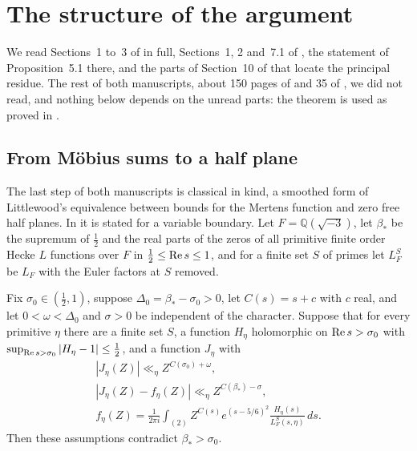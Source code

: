 \section{The structure of the argument}\label{qrh:sec:argument}

We read Sections~1 to~3 of \cite{OAI26b} in full, Sections~1, 2 and~7.1 of \cite{OAI26a}, the statement of Proposition~5.1 there, and the parts of Section~10 of \cite{OAI26a} that locate the principal residue. The rest of both manuscripts, about 150 pages of \cite{OAI26a} and 35 of \cite{OAI26b}, we did not read, and nothing below depends on the unread parts: the theorem is used as proved in \cite{OAI26a}.

\subsection{From M\"obius sums to a half plane}

The last step of both manuscripts is classical in kind, a smoothed form of Littlewood's equivalence between bounds for the Mertens function and zero free half planes. In \cite[Section~2]{OAI26a} it is stated for a variable boundary. Let $F=\mathbb Q(\sqrt{-3})$, let $\beta_*$ be the supremum of $\frac12$ and the real parts of the zeros of all primitive finite order Hecke $L$ functions over $F$ in $\frac12\le\operatorname{Re} s\le1$, and for a finite set $S$ of primes let $L_F^S$ be $L_F$ with the Euler factors at $S$ removed.

\begin{proposition}\label{qrh:prop:cont}
Fix $\sigma_0\in(\frac12,1)$, suppose $\Delta_0=\beta_*-\sigma_0>0$, let $C(s)=s+c$ with $c$ real, and let $0<\omega<\Delta_0$ and $\sigma>0$ be independent of the character. Suppose that for every primitive $\eta$ there are a finite set $S$, a function $H_\eta$ holomorphic on $\operatorname{Re} s>\sigma_0$ with $\sup_{\operatorname{Re} s>\sigma_0}|H_\eta-1|\le\frac12$, and a function $J_\eta$ with
\[
\begin{gathered}|J_\eta(Z)|\ll_\eta Z^{C(\sigma_0)+\omega},\\|J_\eta(Z)-f_\eta(Z)|\ll_\eta Z^{C(\beta_*)-\sigma},\\ f_\eta(Z)=\frac1{2\pi i}\int_{(2)}Z^{C(s)}e^{(s-5/6)^2}\frac{H_\eta(s)}{L_F^S(s,\eta)}\,ds .\end{gathered}
\]
Then these assumptions contradict $\beta_*>\sigma_0$.
\end{proposition}

